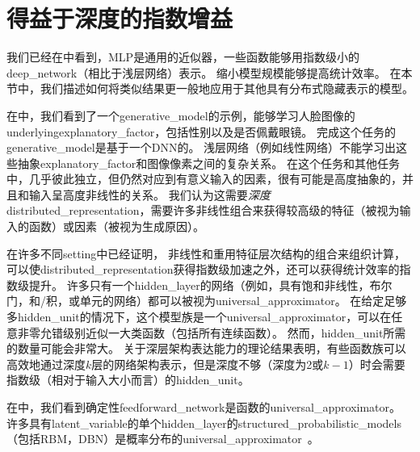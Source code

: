 
\section{得益于深度的指数增益}
\label{sec:exponential_gains_from_depth}
我们已经在中看到，\gls{MLP}是通用的近似器，一些函数能够用指数级小的\gls{deep_network}（相比于浅层网络）表示。
缩小模型规模能够提高统计效率。
在本节中，我们描述如何将类似结果更一般地应用于其他具有分布式隐藏表示的模型。


在中，我们看到了一个\gls{generative_model}的示例，能够学习人脸图像的\gls{underlying}\gls{explanatory_factor}，包括性别以及是否佩戴眼镜。
完成这个任务的\gls{generative_model}是基于一个\gls{DNN}的。
浅层网络（例如线性网络）不能学习出这些抽象\gls{explanatory_factor}和图像像素之间的复杂关系。
在这个任务和其他任务中，几乎彼此独立，但仍然对应到有意义输入的因素，很有可能是高度抽象的，并且和输入呈高度非线性的关系。
我们认为这需要\emph{深度}\gls{distributed_representation}，需要许多非线性组合来获得较高级的特征（被视为输入的函数）或因素（被视为生成原因）。


在许多不同\gls{setting}中已经证明，
非线性和重用特征层次结构的组合来组织计算，可以使\gls{distributed_representation}获得指数级加速之外，还可以获得统计效率的指数级提升。
许多只有一个\gls{hidden_layer}的网络（例如，具有饱和非线性，布尔门，和/积，或单元的网络）都可以被视为\gls{universal_approximator}。
在给定足够多\gls{hidden_unit}的情况下，这个模型族是一个\gls{universal_approximator}，可以在任意非零允错级别近似一大类函数（包括所有连续函数）。
然而，\gls{hidden_unit}所需的数量可能会非常大。
关于深层架构表达能力的理论结果表明，有些函数族可以高效地通过深度$k$层的网络架构表示，但是深度不够（深度为2或$k-1$）时会需要指数级（相对于输入大小而言）的\gls{hidden_unit}。



在中，我们看到确定性\gls{feedforward_network}是函数的\gls{universal_approximator}。
许多具有\gls{latent_variable}的单个\gls{hidden_layer}的\gls{structured_probabilistic_models}（包括\gls{RBM}，\gls{DBN}）是概率分布的\gls{universal_approximator}~\citep{LeRoux-Bengio-2007-TR,Montufar-2011,Montufar-et-al-NIPS2014,Krause-et-al-ICML2013}。

